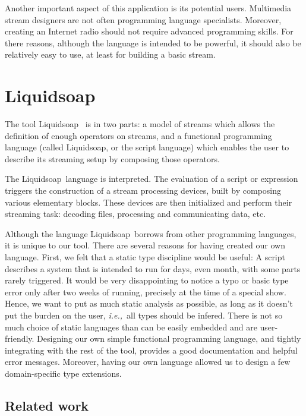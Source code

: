 \documentclass{llncs}
\newcommand{\liquidsoap}{Liquidsoap}
\newcommand{\ie}{{\em i.e.,}}
\begin{document}
Another important aspect of this application is its potential users. Multimedia stream 
designers are not often programming language specialists. Moreover, creating an Internet 
radio should not require advanced programming skills.
For there reasons, although the language is intended to be powerful, it should 
also be relatively easy to use, at least for building a basic stream.

\section{\liquidsoap}

The tool \liquidsoap\ \cite{liquidsoap} is in two parts:
  a model of streams which allows the definition of enough
  operators on streams, and a functional programming language
  (called \liquidsoap, or the script language) which enables
  the user to describe its streaming setup by composing those operators.

The \liquidsoap\ language is interpreted.
The evaluation of a script or expression triggers the construction
of a stream processing devices, built by composing various elementary
blocks.
These devices are then initialized and perform their streaming task:
decoding files, processing and communicating data, etc.


Although the language \liquidsoap\ borrows from other programming
languages, it is unique to our tool.
There are several reasons for having created our own language.
First, we felt that a static type discipline would be useful:
A script describes a system that is intended to run for days,
even month, with some parts rarely triggered.
It would be very disappointing to notice a typo or basic type
error only after two weeks of running, precisely at the time
of a special show.
Hence, we want to put as much static analysis as possible,
as long as it doesn't put the burden on the user,
\ie\ all types should be infered.
There is not so much choice of static languages than can be
easily embedded and are user-friendly.
Designing our own simple functional programming language,
and tightly integrating with the rest of the tool,
provides a good documentation and helpful error messages.
Moreover, having our own language allowed us to design
a few domain-specific type extensions.

\subsection{Related work}
\end{document}
